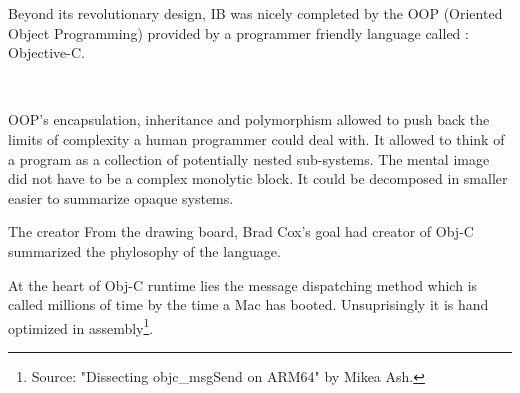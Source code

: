 Beyond its revolutionary design, IB was nicely completed by the OOP (Oriented Object Programming) provided by a programmer friendly language called : Objective-C.\\
\par
{}\\
\par
OOP's encapsulation, inheritance and polymorphism allowed to push back the limits of complexity a human programmer could deal with. It allowed to think of a program as a collection of potentially nested sub-systems. The mental image did not have to be a complex monolytic block. It could be decomposed in smaller easier to summarize opaque systems.\\
\pagebreak
\par
The creator 
From the drawing board, Brad Cox's goal had  creator of Obj-C summarized the phylosophy of the language.\\
\par
At the heart of Obj-C runtime lies the message dispatching method  which is called millions of time by the time a Mac has booted. Unsuprisingly it is hand optimized in assembly\footnote{Source: "Dissecting objc\_msgSend on ARM64" by Mikea Ash.}.\\
\pagebreak

